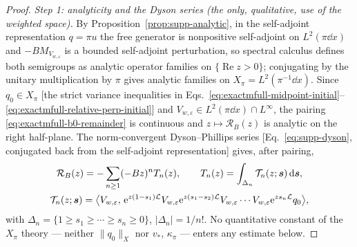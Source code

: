 \begin{proof}
\emph{Step 1: analyticity and the Dyson series (the only, qualitative, use
of the weighted space).}
By Proposition~\ref{prop:supp-analytic}, in the self-adjoint representation
\(q=\pi u\) the free generator is nonpositive self-adjoint on
\(L^2(\pi\dd x)\) and \(-BM_{V_{w,\varepsilon}}\) is a bounded self-adjoint
perturbation, so spectral calculus defines both semigroups as analytic
operator families on \(\{\operatorname{Re}z>0\}\); conjugating by the
unitary multiplication by \(\pi\) gives analytic families on
\(X_\pi=L^2(\pi^{-1}\dd x)\).  Since \(q_0\in X_\pi\) [the strict variance
inequalities in Eqs.~\eqref{eq:exactmfull-midpoint-initial}--%
\eqref{eq:exactmfull-relative-perp-initial}] and
\(V_{w,\varepsilon}\in L^2(\pi\dd x)\cap L^\infty\), the pairing
\eqref{eq:exactmfull-b0-remainder} is continuous and
\(z\mapsto\mathcal R_B(z)\) is analytic on the right half-plane.  The
norm-convergent Dyson--Phillips series [Eq.~\eqref{eq:supp-dyson},
conjugated back from the self-adjoint representation] gives, after pairing,
\begin{equation}
 \begin{gathered}
 \mathcal R_B(z)
 =-\sum_{n\ge1}(-Bz)^n T_n(z),
 \qquad
 T_n(z)=\int_{\Delta_n}\mathcal T_n(z;\bm s)\,\mathrm d\bm s,\\
 \mathcal T_n(z;\bm s)
 =\bigl\langle V_{w,\varepsilon},\,
 \mathrm e^{z(1-s_1)\mathcal L}V_{w,\varepsilon}
 \mathrm e^{z(s_1-s_2)\mathcal L}V_{w,\varepsilon}\cdots V_{w,\varepsilon}
 \mathrm e^{zs_n\mathcal L}q_0\bigr\rangle,
 \end{gathered}
 \label{eq:exactmfull-b0-dyson}
\end{equation}
with \(\Delta_n=\{1\ge s_1\ge\cdots\ge s_n\ge0\}\),
\(|\Delta_n|=1/n!\).  No quantitative constant of the \(X_\pi\)
theory --- neither \(\|q_0\|_X\) nor \(v_*\), \(\kappa_\pi\) --- enters any
estimate below.


\end{proof}

